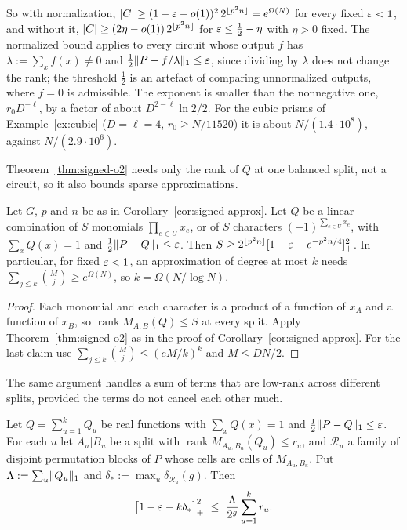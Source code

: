 So with normalization, $\lvert C\rvert\ge(1-\varepsilon-o(1))^2\,2^{\lfloor p^2n\rfloor}=e^{\Omega(N)}$ for every fixed $\varepsilon<1$, and without it, $\lvert C\rvert\ge(2\eta-o(1))\,2^{\lfloor p^2n\rfloor}$ for $\varepsilon\le\frac12-\eta$ with $\eta>0$ fixed. The normalized bound applies to every circuit whose output $f$ has $\lambda:=\sum_xf(x)\ne0$ and $\frac12\lVert P-f/\lambda\rVert_1\le\varepsilon$, since dividing by $\lambda$ does not change the rank; the threshold $\frac12$ is an artefact of comparing unnormalized outputs, where $f=0$ is admissible. The exponent is smaller than the nonnegative one, $r_0D^{-\ell}$, by a factor of about $D^{2-\ell}\ln2/2$. For the cubic prisms of Example~\ref{ex:cubic} ($D=\ell=4$, $r_0\ge N/11520$) it is about $N/(1.4\cdot10^8)$, against $N/(2.9\cdot10^6)$.

Theorem~\ref{thm:signed-o2} needs only the rank of $Q$ at one balanced split, not a circuit, so it also bounds sparse approximations.

\begin{corollary}\label{cor:signed-sparse}
Let $G$, $p$ and $n$ be as in Corollary~\ref{cor:signed-approx}. Let $Q$ be a linear combination of $S$ monomials $\prod_{e\in U}x_e$, or of $S$ characters $(-1)^{\sum_{e\in U}x_e}$, with $\sum_xQ(x)=1$ and $\frac12\lVert P-Q\rVert_1\le\varepsilon$. Then $S\ge2^{\lfloor p^2n\rfloor}[1-\varepsilon-e^{-p^2n/4}]_+^2$. In particular, for fixed $\varepsilon<1$, an approximation of degree at most $k$ needs $\sum_{j\le k}\binom Mj\ge e^{\Omega(N)}$, so $k=\Omega(N/\log N)$.
\end{corollary}

\begin{proof}
Each monomial and each character is a product of a function of $x_A$ and a function of $x_B$, so $\operatorname{rank}M_{A,B}(Q)\le S$ at every split. Apply Theorem~\ref{thm:signed-o2} as in the proof of Corollary~\ref{cor:signed-approx}. For the last claim use $\sum_{j\le k}\binom Mj\le(eM/k)^k$ and $M\le DN/2$.
\end{proof}

The same argument handles a sum of terms that are low-rank across different splits, provided the terms do not cancel each other much.

\begin{proposition}\label{prop:signed-splits}
Let $Q=\sum_{u=1}^kQ_u$ be real functions with $\sum_xQ(x)=1$ and $\frac12\lVert P-Q\rVert_1\le\varepsilon$. For each $u$ let $A_u|B_u$ be a split with $\operatorname{rank}M_{A_u,B_u}(Q_u)\le r_u$, and $\mathcal R_u$ a family of disjoint permutation blocks of $P$ whose cells are cells of $M_{A_u,B_u}$. Put $\Lambda:=\sum_u\lVert Q_u\rVert_1$ and $\delta_*:=\max_u\delta_{\mathcal R_u}(g)$. Then
\[
  \bigl[1-\eps-k\delta_*\bigr]_+^2\ \le\ \frac\Lambda{2^g}\sum_{u=1}^kr_u .
\]
\end{proposition}

